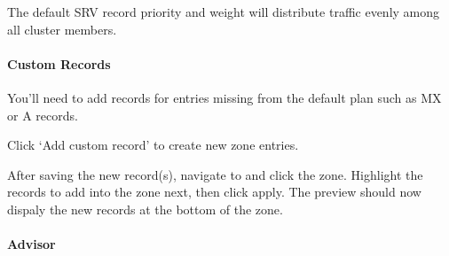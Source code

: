 \documentclass[letterpaper,10pt,english]{sphinxmanual}
\begin{document}
The default SRV record priority and weight will distribute traffic evenly among all cluster members.
\begin{quote}

\end{quote}


\paragraph{Custom Records}
\label{\detokenize{webui:custom-records}}\label{\detokenize{webui:id35}}
You’ll need to add records for entries missing from the default plan such as MX or A records.
\begin{quote}

\end{quote}

Click ‘Add custom record’ to create new zone entries.
\begin{quote}

\end{quote}

After saving the new record(s), navigate to {\hyperref[\detokenize{webui:id34}]{}} and click the zone. Highlight the records to add into the zone next, then click apply. The preview should now dispaly the new records at the bottom of the zone.
\begin{quote}

\end{quote}


\paragraph{Advisor}
\label{\detokenize{webui:advisor}}\begin{quote}

\end{quote}
\end{document}
